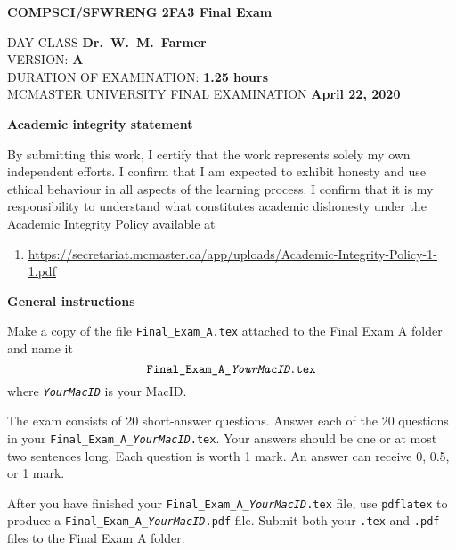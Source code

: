 \documentclass[12pt,fleqn]{article}
\newcommand{\bsp}{\begin{sloppypar}}
\newcommand{\esp}{\end{sloppypar}}
\begin{document}
\begin{center} 
{\large \bf COMPSCI/SFWRENG 2FA3 Final Exam}\\[1ex]
\end{center}

\medskip

\noindent
DAY CLASS \hfill \textbf{Dr.~W.~M.~Farmer}\\
VERSION: \hfill \textbf{A}\\
DURATION OF EXAMINATION: \hfill \textbf{1.25 hours} \\
MCMASTER UNIVERSITY FINAL EXAMINATION \hfill \textbf{April 22, 2020}

\bigskip

\noindent
\textbf{Academic integrity statement}

\medskip

By submitting this work, I certify that the work represents solely my
own independent efforts. I confirm that I am expected to exhibit
honesty and use ethical behaviour in all aspects of the learning
process.  I confirm that it is my responsibility to understand what
constitutes academic dishonesty under the Academic Integrity Policy
available at

\begin{enumerate}

  \item[] \bsp \href{https://secretariat.mcmaster.ca/app/uploads/Academic-Integrity-Policy-1-1.pdf}{\url{https://secretariat.mcmaster.ca/app/uploads/Academic-Integrity-Policy-1-1.pdf}} \esp

\end{enumerate}

\noindent
\textbf{General instructions}

\medskip

Make a copy of the file \texttt{Final\_Exam\_A.tex} attached to the
Final Exam A folder and name it
\[\texttt{Final\_Exam\_A\_\emph{YourMacID}.tex}\] where \texttt{\emph{YourMacID}}
is your MacID.


The exam consists of 20 short-answer questions.  Answer each of the 20
questions in your \texttt{Final\_Exam\_A\_\emph{YourMacID}.tex}.  Your
answers should be one or at most two sentences long.  Each question is
worth 1 mark.  An answer can receive 0, 0.5, or 1 mark.

\bsp
After you have finished your
\texttt{Final\_Exam\_A\_\emph{YourMacID}.tex} file, use
\texttt{pdflatex} to produce a
\texttt{Final\_Exam\_A\_\emph{YourMacID}.pdf} file.  Submit both your
\texttt{.tex} and \texttt{.pdf} files to the Final Exam A folder.
\esp
\end{document}
